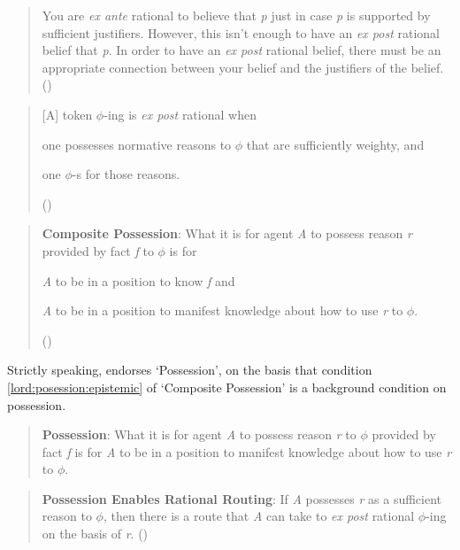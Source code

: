 \documentclass[10pt]{article}
\begin{document}
\begin{quote}
  You are \emph{ex ante} rational to believe that \emph{p} just in case \emph{p} is supported by sufficient justifiers.
  However, this isn't enough to have an \emph{ex post} rational belief that \emph{p}.
  In order to have an \emph{ex post} rational belief, there must be an appropriate connection between your belief and the justifiers of the belief.\nolinebreak
  \mbox{}\hfill\mbox{(\citeyear[70]{Lord:2018aa})}
\end{quote}

\begin{quote}
  [A] token \(\phi\)-ing is \emph{ex post} rational when
  \begin{enumerate*}[label=(\roman*), ref=\roman*.]
  \item one possesses normative reasons to \(\phi\) that are sufficiently weighty, and
  \item one \(\phi\)-s for those reasons.
  \end{enumerate*}
  \nolinebreak
  \mbox{}\hfill\mbox{(\citeyear[10]{Lord:2018aa})}
\end{quote}

\begin{quote}
  \textbf{Composite Possession}: What it is for agent \emph{A} to possess reason \emph{r} provided by fact \emph{f} to \(\phi\) is for
  \begin{enumerate*}[label=(\roman*), ref=\roman*.]
  \item\label{lord:posession:epistemic} \emph{A} to be in a position to know \emph{f} and
  \item\label{lord:posession:manifest} \emph{A} to be in a position to manifest knowledge about how to use \emph{r} to \(\phi\).
  \end{enumerate*}
  \nolinebreak
  \mbox{}\hfill\mbox{(\citeyear[123]{Lord:2018aa})}
\end{quote}

Strictly speaking, \citeauthor{Lord:2018aa} endorses `Possession', on the basis that condition \ref{lord:posession:epistemic} of `Composite Possession' is a background condition on possession.

\begin{quote}
  \textbf{Possession}: What it is for agent \emph{A} to possess reason \emph{r} to \(\phi\) provided by fact \emph{f} is for \emph{A} to be in a position to manifest knowledge about how to use \emph{r} to \(\phi\).
\end{quote}

\begin{quote}
  \textbf{Possession Enables Rational Routing}: If \emph{A} possesses \emph{r} as a sufficient reason to \(\phi\), then there is a route that \emph{A} can take to \emph{ex post} rational \(\phi\)-ing on the basis of \emph{r}.\nolinebreak
  \mbox{}\hfill\mbox{(\citeyear[100]{Lord:2018aa})}
\end{quote}
\end{document}
